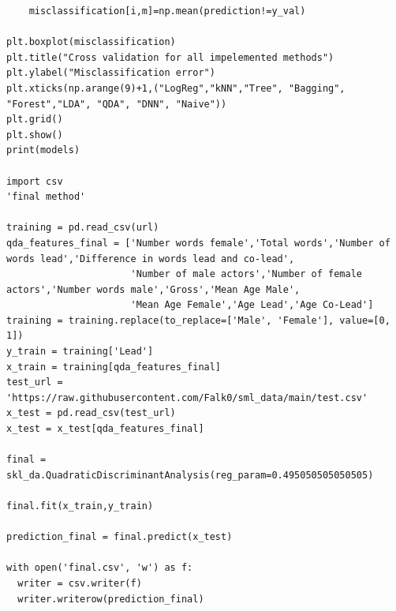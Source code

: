 \documentclass{article}
\begin{document}
\begin{verbatim}
    misclassification[i,m]=np.mean(prediction!=y_val)

plt.boxplot(misclassification)
plt.title("Cross validation for all impelemented methods")
plt.ylabel("Misclassification error")
plt.xticks(np.arange(9)+1,("LogReg","kNN","Tree", "Bagging", "Forest","LDA", "QDA", "DNN", "Naive"))
plt.grid()
plt.show()
print(models)

import csv
'final method'

training = pd.read_csv(url)
qda_features_final = ['Number words female','Total words','Number of words lead','Difference in words lead and co-lead',
                      'Number of male actors','Number of female actors','Number words male','Gross','Mean Age Male',
                      'Mean Age Female','Age Lead','Age Co-Lead']
training = training.replace(to_replace=['Male', 'Female'], value=[0, 1])
y_train = training['Lead']
x_train = training[qda_features_final]
test_url = 'https://raw.githubusercontent.com/Falk0/sml_data/main/test.csv'
x_test = pd.read_csv(test_url)
x_test = x_test[qda_features_final]

final = skl_da.QuadraticDiscriminantAnalysis(reg_param=0.495050505050505)

final.fit(x_train,y_train)

prediction_final = final.predict(x_test)

with open('final.csv', 'w') as f:
  writer = csv.writer(f)
  writer.writerow(prediction_final)

\end{verbatim}




\end{document}
